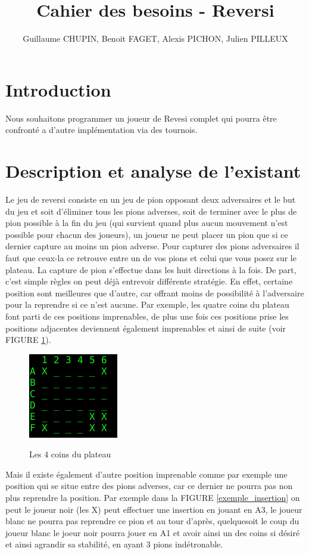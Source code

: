 \documentclass[10pt, a4paper]{article}
\title {Cahier des besoins - Reversi}
\author {Guillaume CHUPIN, Benoit FAGET, Alexis PICHON, Julien PILLEUX}
\begin{document}
\maketitle
\thispagestyle {empty}
\newpage
\tableofcontents
\newpage

\section {Introduction}
Nous souhaitons programmer un joueur de Revesi complet qui pourra être confronté a d'autre implémentation via des tournois.

\section {Description et analyse de l'existant}
Le jeu de reversi consiste en un jeu de pion opposant deux adversaires et le but du jeu et soit d'éliminer tous les pions adverses, soit de terminer avec le plus de pion possible à la fin du jeu (qui survient quand plus aucun mouvement n'est possible pour chacun des joueurs), un joueur ne peut placer un pion que si ce dernier capture au moins un pion adverse. Pour capturer des pions adversaires il faut que ceux-la ce retrouve entre un de vos pions et celui que vous posez sur le plateau. La capture de pion s'effectue dans les huit directions à la fois.
De part, c'est simple règles on peut déjà entrevoir différente stratégie. En effet, certaine position sont meilleures que d'autre, car offrant moins de possibilité à l'adversaire pour la reprendre si ce n'est aucune. Par exemple, les quatre coins du plateau font parti de ces positions imprenables, de plus une fois ces positions prise les positions adjacentes deviennent également imprenables et ainsi de suite (voir FIGURE \ref{bord_stable}).
\begin {figure}[H]
  \centering
  \includegraphics [scale = 0.5]{images/bord_stable.png}
  \label {bord_stable}
  \caption {Les 4 coins du plateau}
\end {figure}
Mais il existe également d'autre position imprenable comme par exemple une position qui se situe entre des pions adverses, car ce dernier ne pourra pas non plus reprendre la position. Par exemple dans la FIGURE \ref{exemple_insertion} on peut le joueur noir (les X) peut effectuer une insertion en jouant en A3, le joueur blanc ne pourra pas reprendre ce pion et au tour d'après, quelquesoit le coup du joueur blanc le joeur noir pourra jouer en A1 et avoir ainsi un des coins si désiré et ainsi agrandir sa stabilité, en ayant 3 pions indétronable.
\end{document}

